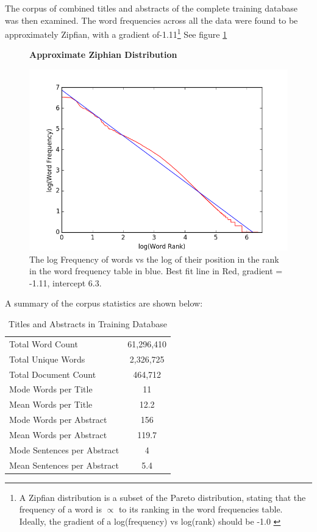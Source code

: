 The corpus of combined titles and abstracts of the complete training database was then examined. The word frequencies across all the data were found to be approximately Zipfian, with a gradient of-1.11\footnote{A Zipfian distribution is a subset of the Pareto distribution, stating that the frequency of a word is $\propto$ to its ranking in the word frequencies table. Ideally, the gradient of a log(frequency) vs log(rank) should be -1.0 \cite{zipf}} See figure \ref{fig:ZIPF}
\begin{figure}[H]
    \centering
    \textbf{Approximate Ziphian Distribution}\par\medskip
    \includegraphics[scale=0.4]{Data_Acquisition/zipf.png}
    \caption{The log Frequency of words vs the log of their position in the rank in the word frequency table in blue. Best fit line in Red, gradient = -1.11, intercept 6.3. }
     \label{fig:ZIPF}
\end{figure}
A summary of the corpus statistics are shown below:
\begin{table}[h!]
\label{tab:CORPUS STATS}
\caption{Titles and Abstracts in Training Database}
\begin{center}
\begin{tabular}{||l|c||}
\hline
Total Word Count & 61,296,410\\
Total Unique Words & 2,326,725\\
Total Document Count & 464,712\\
Mode Words per Title &  11\\
Mean Words per Title &  12.2\\
Mode Words per Abstract & 156\\
Mean Words per Abstract & 119.7\\
Mode Sentences per Abstract & 4\\
Mean Sentences per Abstract & 5.4\\
\hline
\end{tabular}
\end{center}
\end{table}

\label{sec:SCRAPEANALYSIS}
